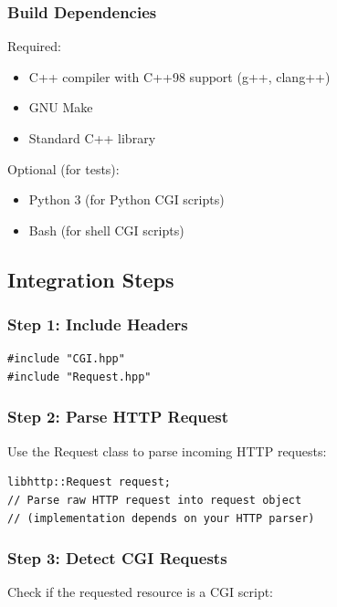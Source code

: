 \documentclass[11pt,a4paper]{article}
\begin{document}
\subsubsection{Build Dependencies}

Required:
\begin{itemize}
    \item C++ compiler with C++98 support (g++, clang++)
    \item GNU Make
    \item Standard C++ library
\end{itemize}

Optional (for tests):
\begin{itemize}
    \item Python 3 (for Python CGI scripts)
    \item Bash (for shell CGI scripts)
\end{itemize}

\subsection{Integration Steps}

\subsubsection{Step 1: Include Headers}

\begin{lstlisting}[caption=Include CGI Headers]
#include "CGI.hpp"
#include "Request.hpp"
\end{lstlisting}

\subsubsection{Step 2: Parse HTTP Request}

Use the Request class to parse incoming HTTP requests:

\begin{lstlisting}[caption=Request Parsing]
libhttp::Request request;
// Parse raw HTTP request into request object
// (implementation depends on your HTTP parser)
\end{lstlisting}

\subsubsection{Step 3: Detect CGI Requests}

Check if the requested resource is a CGI script:
\end{document}
